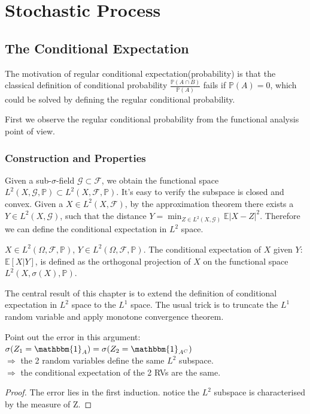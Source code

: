 \chapter{Stochastic Process}

\newpage
\section{The Conditional Expectation}
The motivation of regular conditional expectation(probability) is that the classical definition of conditional probability $\frac{\mathbb{P}(A \cap B)}{\mathbb{P}(A)}$ fails if $\mathbb{P}(A) = 0$, which could be solved by defining the regular conditional probability.\par 
 First we observe the regular conditional probability from the functional analysis point of view. 


\subsection{Construction and Properties}
Given a sub-$\sigma$-field $\mathcal{G}\subset \mathcal{F}$, we obtain the functional space $L^2(X, \mathcal{G}, \mathbb{P}) \subset L^2(X, \mathcal{F}, \mathbb{P})$. It's easy to verify the subspace is closed and convex. Given a $X \in L^2(X, \mathcal{F})$, by the approximation theorem there exists a $Y \in L^2(X, \mathcal{G})$, such that the distance $Y = \min_{ Z \in L^2(X, \mathcal{G})}\mathbb{E}|X - Z|^2$. Therefore we can define the conditional expectation in $L^2$ space.
\begin{definition}
$X \in L^2(\Omega, \mathcal{F}, \mathbb{P})$, $Y \in L^2(\Omega, \mathcal{F}, \mathbb{P})$. The conditional expectation of $X$ given $Y$: $\mathbb{E}[X|Y]$,  is defined as the orthogonal projection of $X$ on the functional space $L^2(X, \sigma(X), \mathbb{P})$.
\end{definition}

The central result of this chapter is to extend the definition of conditional expectation in $L^2$ space to the $L^1$ space. The usual trick is to truncate the $L^1$ random variable and apply monotone convergence theorem.

\begin{exercise}
	Point out the error in this argument:\\
	$\sigma(Z_1 = \mathbbm{1}_A) = \sigma( Z_2 = \mathbbm{1}_{A^C})$\\
	$\Rightarrow$ the 2 random variables define the same $L^2$ subspace.\\
	$\Rightarrow$ the conditional expectation of the 2 RVs are the same.
\end{exercise}
\begin{proof}
	The error lies in the first induction. notice the $L^2$ subspace is characterised by the measure of Z.
\end{proof}

